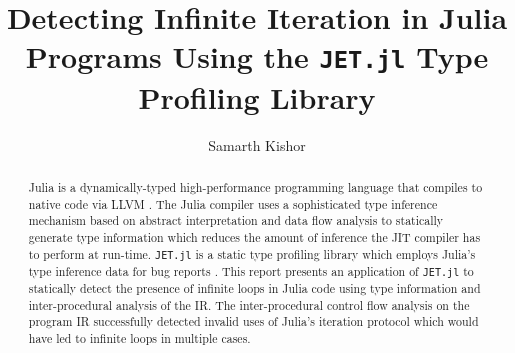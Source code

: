 \documentclass[manuscript, nonacm]{acmart}
\begin{document}
\title{Detecting Infinite Iteration in Julia Programs Using the \texttt{JET.jl} Type Profiling Library}

\author{Samarth Kishor}

\begin{abstract}
  Julia is a dynamically-typed high-performance programming language that compiles to native code via LLVM \cite{julia17}. The Julia compiler uses a sophisticated type inference mechanism based on abstract interpretation and data flow analysis to statically generate type information which reduces the amount of inference the JIT compiler has to perform at run-time. \texttt{JET.jl} is a static type profiling library which employs Julia's type inference data for bug reports \cite{Kadowaki21}. This report presents an application of \texttt{JET.jl} to statically detect the presence of infinite loops in Julia code using type information and inter-procedural analysis of the IR. The inter-procedural control flow analysis on the program IR successfully detected invalid uses of Julia's iteration protocol which would have led to infinite loops in multiple cases.
\end{abstract}


\maketitle
\end{document}
